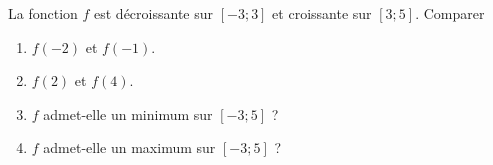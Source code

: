 
La fonction $f$ est décroissante sur $[-3;3]$ et croissante sur $[3;5]$.
Comparer
\begin{enumerate}
\item $f(-2)$ et $f(-1)$.
\item $f(2)$ et $f(4)$.
\item $f$ admet-elle un minimum sur $[-3;5]$ ? 
\item $f$ admet-elle un maximum sur $[-3;5]$ ? 
\end{enumerate}